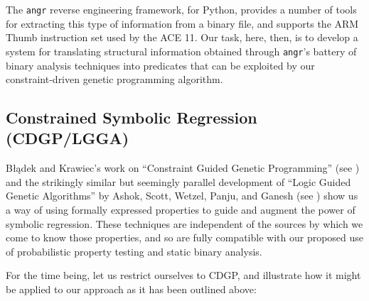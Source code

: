 \documentclass[11pt]{article}
\begin{document}
The \texttt{angr} reverse engineering framework, for Python, provides a number of tools for extracting this type of information from a binary file, and supports the ARM Thumb instruction set used by the ACE 11. Our task, here, then, is to develop a system for translating structural information obtained through \texttt{angr}'s battery of binary analysis techniques into predicates that can be exploited by our constraint-driven genetic programming algorithm.


\subsection{Constrained Symbolic Regression (CDGP/LGGA)}
\label{sec:org22f5e69}
Błądek and Krawiec's work on ``Constraint Guided Genetic Programming'' (see \cite{bladek2019symbolic}) and the strikingly similar but seemingly parallel development of ``Logic Guided Genetic Algorithms'' by Ashok, Scott, Wetzel, Panju, and Ganesh (see \cite{ashok2020logic}) show us a way of using formally expressed properties to guide and augment the power of symbolic regression. These techniques are independent of the sources by which we come to know those properties, and so are fully compatible with our proposed use of probabilistic property testing and static binary analysis.

For the time being, let us restrict ourselves to CDGP, and illustrate how it might be applied to our approach as it has been outlined above:
\end{document}
